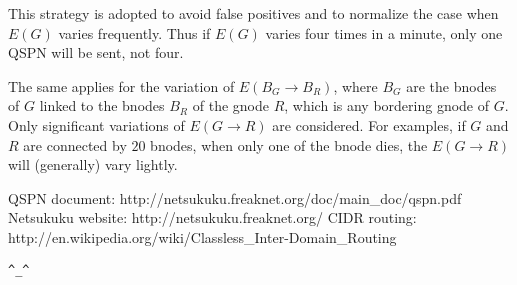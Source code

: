 \documentclass[a4paper]{article}
\newcommand{\href}[2]{ #1 }
\begin{document}
This strategy is adopted to avoid false positives and to normalize the case
when $E(G)$ varies frequently. Thus if $E(G)$ varies four times in a minute,
only one QSPN will be sent, not four.

The same applies for the variation of $E(B_G\rightarrow B_R)$, where $B_G$ are
the bnodes of $G$ linked to the bnodes $B_R$ of the gnode $R$, which is any
bordering gnode of $G$. Only significant variations of $E(G\rightarrow R)$ are
considered. For examples, if $G$ and $R$ are connected by $20$ bnodes, when
only one of the bnode dies, the $E(G\rightarrow R)$ will (generally) vary lightly.


%


\begin{thebibliography}{99}
	 QSPN document:
		\href{http://netsukuku.freaknet.org/doc/main\_doc/qspn.pdf}{qspn.pdf}
	 Netsukuku website:
		\href{http://netsukuku.freaknet.org/}{http://netsukuku.freaknet.org/}
	 CIDR routing:
		\href{http://en.wikipedia.org/wiki/Classless\_Inter-Domain\_Routing}{Classless\_Inter-Domain\_Routing in Wikipedia}
\end{thebibliography}
\newpage

\begin{center}
\verb|^_^|
\end{center}
\end{document}

